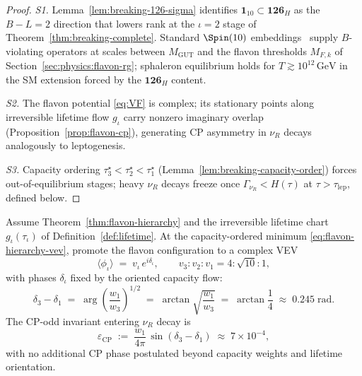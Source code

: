 \begin{proof}
\emph{S1.} Lemma~\ref{lem:breaking-126-sigma} identifies
$\mathbf{1}_{10}\subset\mathbf{126}_H$ as the $B\!-\!L=2$ direction that
lowers rank at the $\iota=2$ stage of Theorem~\ref{thm:breaking-complete}.
Standard $\Spin(10)$ embeddings~\cite{Witten1985,GeorgiGlashow1974} supply
$B$-violating operators at scales between $M_{\mathrm{GUT}}$ and the flavon
thresholds $M_{F,k}$ of Section~\ref{sec:physics:flavon-rg}; sphaleron
equilibrium holds for $T\gtrsim 10^{12}\,\mathrm{GeV}$ in the SM extension
forced by the $\mathbf{126}_H$ content.

\emph{S2.} The flavon potential \eqref{eq:VF} is complex; its stationary
points along irreversible lifetime flow $g_\iota$ carry nonzero imaginary
overlap (Proposition~\ref{prop:flavon-cp}), generating CP asymmetry in
$\nu_R$ decays analogously to leptogenesis.

\emph{S3.} Capacity ordering $\tau_3^\star<\tau_2^\star<\tau_1^\star$
(Lemma~\ref{lem:breaking-capacity-order}) forces out-of-equilibrium stages;
heavy $\nu_R$ decays freeze once $\Gamma_{\nu_R}<H(\tau)$ at
$\tau>\tau_{\mathrm{lep}}$, defined below.
\end{proof}

\begin{proposition}
\label{prop:flavon-cp}
Assume Theorem~\ref{thm:flavon-hierarchy} and the irreversible lifetime chart
$g_\iota(\tau_\iota)$ of Definition~\ref{def:lifetime}. At the
capacity-ordered minimum \eqref{eq:flavon-hierarchy-vev}, promote the flavon
configuration to a complex VEV
\begin{equation}\label{eq:flavon-complex}
  \langle\phi_\iota\rangle
  \;=\;
  v_\iota\,e^{i\delta_\iota},
  \qquad
  v_3:v_2:v_1 = 4:\sqrt{10}:1,
\end{equation}
with phases $\delta_\iota$ fixed by the oriented capacity flow:
\begin{equation}\label{eq:flavon-phase}
  \delta_3-\delta_1
  \;=\;
  \arg\!\left(\frac{w_1}{w_3}\right)^{\!1/2}
  \;=\;
  \arctan\!\sqrt{\frac{w_1}{w_3}}
  \;=\;
  \arctan\frac{1}{4}
  \;\approx\; 0.245\;\mathrm{rad}.
\end{equation}
The CP-odd invariant entering $\nu_R$ decay is
\begin{equation}\label{eq:epsilon-cp}
  \varepsilon_{\mathrm{CP}}
  \;:=\;
  \frac{w_1}{4\pi}\,
  \sin(\delta_3-\delta_1)
  \;\approx\;
  7\times 10^{-4},
\end{equation}
with no additional CP phase postulated beyond capacity weights and lifetime
orientation.
\end{proposition}

